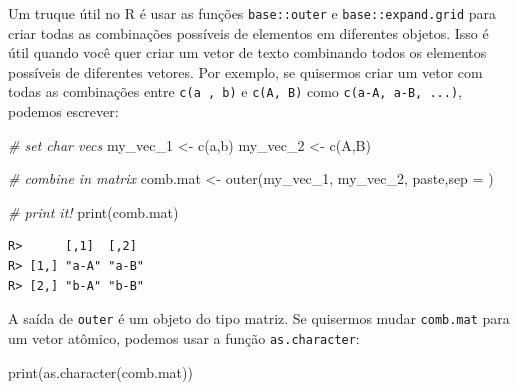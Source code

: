 \documentclass[
  11pt,
]{book}
\newenvironment{Shaded}{\begin{snugshade}}{\end{snugshade}}
\newcommand{\AttributeTok}[1]{\textcolor[rgb]{0.61,0.61,0.61}{#1}}
\newcommand{\CommentTok}[1]{\textcolor[rgb]{0.37,0.37,0.37}{\textit{#1}}}
\newcommand{\FunctionTok}[1]{\textcolor[rgb]{0,0,0}{#1}}
\newcommand{\NormalTok}[1]{#1}
\newcommand{\OtherTok}[1]{\textcolor[rgb]{0.37,0.37,0.37}{#1}}
\newcommand{\StringTok}[1]{\textcolor[rgb]{0.5,0.5,0.5}{#1}}
\begin{document}
Um truque útil no R é usar as funções \texttt{base::outer} e \texttt{base::expand.grid} para criar todas as combinações possíveis de elementos em diferentes objetos. Isso é útil quando você quer criar um vetor de texto combinando todos os elementos possíveis de diferentes vetores. Por exemplo, se quisermos criar um vetor com todas as combinações entre \texttt{c(\textquotesingle{}a\textquotesingle{}\ ,\ \textquotesingle{}b\textquotesingle{})} e \texttt{c(\textquotesingle{}A\textquotesingle{},\ \textquotesingle{}B\textquotesingle{})} como \texttt{c(\textquotesingle{}a-A\textquotesingle{},\ \textquotesingle{}a-B\textquotesingle{},\ ...)}, podemos escrever:  

\begin{Shaded}
\begin{Highlighting}[]
\CommentTok{\# set char vecs}
\NormalTok{my\_vec\_1 }\OtherTok{\textless{}{-}} \FunctionTok{c}\NormalTok{(}\StringTok{\textquotesingle{}a\textquotesingle{}}\NormalTok{,}\StringTok{\textquotesingle{}b\textquotesingle{}}\NormalTok{)}
\NormalTok{my\_vec\_2 }\OtherTok{\textless{}{-}} \FunctionTok{c}\NormalTok{(}\StringTok{\textquotesingle{}A\textquotesingle{}}\NormalTok{,}\StringTok{\textquotesingle{}B\textquotesingle{}}\NormalTok{)}

\CommentTok{\# combine in matrix}
\NormalTok{comb.mat }\OtherTok{\textless{}{-}} \FunctionTok{outer}\NormalTok{(my\_vec\_1,}
\NormalTok{                  my\_vec\_2,}
\NormalTok{                  paste,}\AttributeTok{sep =} \StringTok{\textquotesingle{}{-}\textquotesingle{}}\NormalTok{)}

\CommentTok{\# print it!}
\FunctionTok{print}\NormalTok{(comb.mat)}
\end{Highlighting}
\end{Shaded}

\begin{verbatim}
R>      [,1]  [,2] 
R> [1,] "a-A" "a-B"
R> [2,] "b-A" "b-B"
\end{verbatim}

A saída de \texttt{outer} é um objeto do tipo matriz. Se quisermos mudar \texttt{comb.mat} para um vetor atômico, podemos usar a função \texttt{as.character}: 

\begin{Shaded}
\begin{Highlighting}[]
\FunctionTok{print}\NormalTok{(}\FunctionTok{as.character}\NormalTok{(comb.mat))}
\end{Highlighting}
\end{Shaded}
\end{document}
